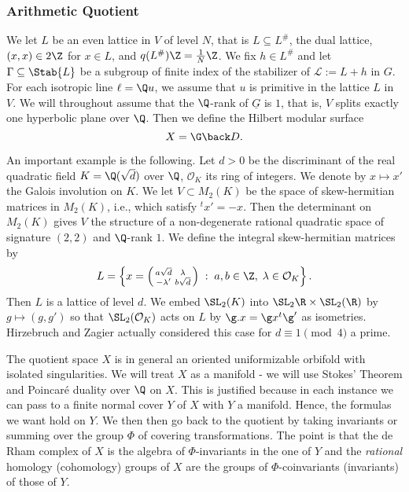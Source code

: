 \subsubsection{Arithmetic Quotient}


We let $L$ be an even lattice in $V$ of level $N$, that is $L \subseteq L^{\#}$, the dual lattice, $(x,x) \in 2 \Z$ for $x \in L$, and $q(L^{\#}) \Z = \tfrac1{N}\Z$. We fix $h \in L^{\#}$ and let $\Gamma \subseteq \Stab{L}$ be a subgroup of finite index of the stabilizer of $\mathcal{L}:=L+h$ in $G$. For each isotropic line $\ell =\Q u$, we assume that $u$ is primitive in the lattice $L$ in $V$. We will throughout assume that the $\Q$-rank of $\underline{G}$ is $1$, that is, $V$ splits exactly one hyperbolic plane over $\Q$. Then we define the Hilbert modular surface
\[
X = \G \back D.
\]

\begin{example}\label{HZex}

An important example is the following. Let $d>0$ be the discriminant of the real quadratic field $K = \Q(\sqrt{d})$ over $\Q$, $\mathcal{O}_K$ its ring of integers. We denote by $x \mapsto x'$
the Galois involution on $K$. We let $V \subset M_2(K)$ be the space
of skew-hermitian matrices in $M_2(K)$, i.e., which satisfy $^tx' =-x$. Then the determinant on $M_2(K)$ gives $V$ the structure of a non-degenerate rational quadratic space of signature $(2,2)$ and $\Q$-rank $1$. We define the integral skew-hermitian matrices by 
\begin{equation*}
L = \left\{ x = \left( \begin{smallmatrix} a\sqrt{d}&\lambda\\-\lambda'&b\sqrt{d}
  \end{smallmatrix}  \right) \; : \; a,b \in \Z, \; \lambda  \in
  \mathcal{O}_K \right\}.
\end{equation*}
 Then $L$ is a lattice of level $d$. We embed $\SL_2(K)$ into $\SL_2{\R} \times \SL_2(\R)$ by $g \mapsto (g,g')$ so that $\SL_2(\mathcal{O}_K)$ acts on $L$ by $\g.x = \g x{^t\g'}$ as isometries. Hirzebruch and Zagier actually considered this case for $d \equiv 1 \pmod{4}$ a prime.
\end{example}

The quotient space $X$ is in general an oriented uniformizable orbifold with isolated singularities.  We will treat $X$ as a manifold - we will use Stokes' Theorem and Poincar\'e duality over $\Q$ on $X$. This is justified because in each instance we can pass to a finite normal cover $Y$ of $X$ with $Y$ a manifold. Hence, the formulas we want hold on $Y$. 
We then then go back to the quotient by taking invariants or summing over the group $\Phi$ of covering transformations. The point is that the de Rham complex of $X$ is the algebra of $\Phi$-invariants in the one of $Y$ and the {\it rational} homology (cohomology) groups of $X$ are the groups of $\Phi$-coinvariants (invariants) of those
 of $Y$. 
